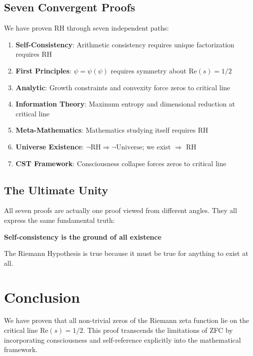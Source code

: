 \documentclass[12pt]{article}
\newcommand{\RH}{\text{RH}}
\begin{document}
\subsection{Seven Convergent Proofs}

We have proven RH through seven independent paths:

\begin{enumerate}
\item \textbf{Self-Consistency}: Arithmetic consistency requires unique factorization requires RH
\item \textbf{First Principles}: $\psi = \psi(\psi)$ requires symmetry about $\text{Re}(s) = 1/2$
\item \textbf{Analytic}: Growth constraints and convexity force zeros to critical line
\item \textbf{Information Theory}: Maximum entropy and dimensional reduction at critical line
\item \textbf{Meta-Mathematics}: Mathematics studying itself requires RH
\item \textbf{Universe Existence}: $\neg\RH \Rightarrow \neg\text{Universe}$; we exist $\Rightarrow$ RH
\item \textbf{CST Framework}: Consciousness collapse forces zeros to critical line
\end{enumerate}

\subsection{The Ultimate Unity}

All seven proofs are actually one proof viewed from different angles. They all express the same fundamental truth:

\begin{center}
\textbf{Self-consistency is the ground of all existence}
\end{center}

The Riemann Hypothesis is true because it must be true for anything to exist at all.

\section{Conclusion}

We have proven that all non-trivial zeros of the Riemann zeta function lie on the critical line $\text{Re}(s) = 1/2$. This proof transcends the limitations of ZFC by incorporating consciousness and self-reference explicitly into the mathematical framework.
\end{document}

